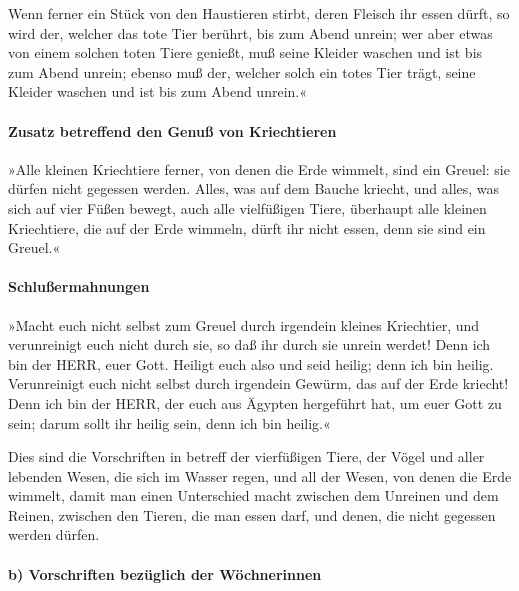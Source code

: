 Wenn ferner ein Stück von den Haustieren stirbt, deren
Fleisch ihr essen dürft, so wird der, welcher das tote Tier berührt, bis
zum Abend unrein; wer aber etwas von einem solchen toten
Tiere genießt, muß seine Kleider waschen und ist bis zum Abend unrein;
ebenso muß der, welcher solch ein totes Tier trägt, seine Kleider
waschen und ist bis zum Abend unrein.«

\hypertarget{zusatz-betreffend-den-genuuxdf-von-kriechtieren}{%
\paragraph{Zusatz betreffend den Genuß von
Kriechtieren}\label{zusatz-betreffend-den-genuuxdf-von-kriechtieren}}

»Alle kleinen Kriechtiere ferner, von denen die Erde
wimmelt, sind ein Greuel: sie dürfen nicht gegessen werden.
Alles, was auf dem Bauche kriecht, und alles, was sich
auf vier Füßen bewegt, auch alle vielfüßigen Tiere, überhaupt alle
kleinen Kriechtiere, die auf der Erde wimmeln, dürft ihr nicht essen,
denn sie sind ein Greuel.«

\hypertarget{schluuxdfermahnungen}{%
\paragraph{Schlußermahnungen}\label{schluuxdfermahnungen}}

»Macht euch nicht selbst zum Greuel durch irgendein
kleines Kriechtier, und verunreinigt euch nicht durch sie, so daß ihr
durch sie unrein werdet! Denn ich bin der HERR, euer
Gott. Heiligt euch also und seid heilig; denn ich bin heilig.
Verunreinigt euch nicht selbst durch irgendein Gewürm, das auf der Erde
kriecht! Denn ich bin der HERR, der euch aus Ägypten
hergeführt hat, um euer Gott zu sein; darum sollt ihr heilig sein, denn
ich bin heilig.«

Dies sind die Vorschriften in betreff der vierfüßigen
Tiere, der Vögel und aller lebenden Wesen, die sich im Wasser regen, und
all der Wesen, von denen die Erde wimmelt, damit man
einen Unterschied macht zwischen dem Unreinen und dem Reinen, zwischen
den Tieren, die man essen darf, und denen, die nicht gegessen werden
dürfen.

\hypertarget{b-vorschriften-bezuxfcglich-der-wuxf6chnerinnen}{%
\paragraph{b) Vorschriften bezüglich der
Wöchnerinnen}\label{b-vorschriften-bezuxfcglich-der-wuxf6chnerinnen}}

